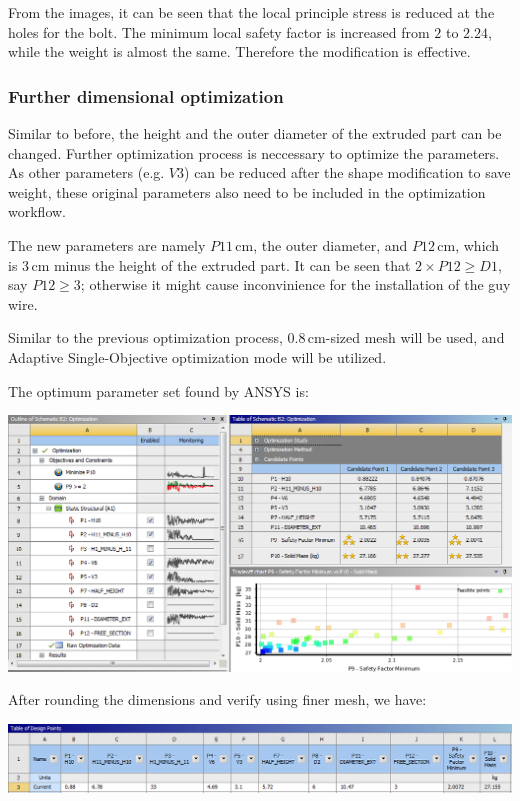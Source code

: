 \documentclass[a4paper,14pt]{extarticle}
\newcommand{\cm}{\,\si{\centi\meter}}
\begin{document}
From the images, it can be seen that the local principle stress is reduced at the holes for the bolt. The minimum local safety factor is increased from $2$ to $2.24$, while the weight is almost the same. Therefore the modification is effective.
\subsubsection{Further dimensional optimization}
Similar to before, the height and the outer diameter of the extruded part can be changed. Further optimization process is neccessary to optimize the parameters. As other parameters (e.g. $V3$) can be reduced after the shape modification to save weight, these original parameters also need to be included in the optimization workflow.

The new parameters are namely $P11\cm$, the outer diameter, and $P12 \cm$, which is $3\cm$ minus the height of the extruded part. It can be seen that $2 \times P12 \geq D1$, say $P12 \geq 3$; otherwise it might cause inconvinience for the installation of the guy wire.

Similar to the previous optimization process, $0.8\cm$-sized mesh will be used, and Adaptive Single-Objective optimization mode will be utilized.

The optimum parameter set found by ANSYS is:

\includegraphics[width=\textwidth]{NX/best.png}

After rounding the dimensions and verify using finer mesh, we have:

\includegraphics[width=\textwidth]{NX/Finale.PNG}
\end{document}
